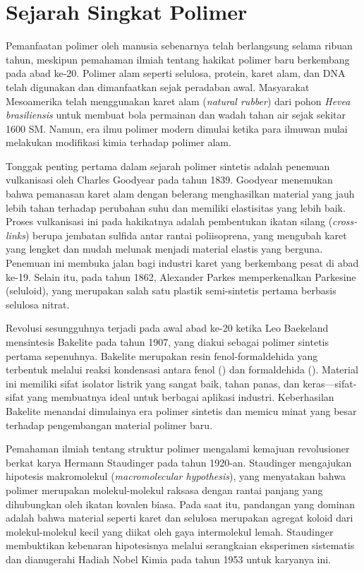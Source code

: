 \documentclass[12pt,a4paper,openany]{book}
\begin{document}
\section{Sejarah Singkat Polimer}

Pemanfaatan polimer oleh manusia sebenarnya telah berlangsung selama ribuan tahun, meskipun pemahaman ilmiah tentang hakikat polimer baru berkembang pada abad ke-20. Polimer alam seperti selulosa, protein, karet alam, dan DNA telah digunakan dan dimanfaatkan sejak peradaban awal. Masyarakat Mesoamerika telah menggunakan karet alam (\textit{natural rubber}) dari pohon \textit{Hevea brasiliensis} untuk membuat bola permainan dan wadah tahan air sejak sekitar 1600 SM. Namun, era ilmu polimer modern dimulai ketika para ilmuwan mulai melakukan modifikasi kimia terhadap polimer alam.

Tonggak penting pertama dalam sejarah polimer sintetis adalah penemuan vulkanisasi oleh Charles Goodyear pada tahun 1839. Goodyear menemukan bahwa pemanasan karet alam dengan belerang menghasilkan material yang jauh lebih tahan terhadap perubahan suhu dan memiliki elastisitas yang lebih baik. Proses vulkanisasi ini pada hakikatnya adalah pembentukan ikatan silang (\textit{cross-links}) berupa jembatan sulfida  antar rantai poliisoprena, yang mengubah karet yang lengket dan mudah melunak menjadi material elastis yang berguna. Penemuan ini membuka jalan bagi industri karet yang berkembang pesat di abad ke-19. Selain itu, pada tahun 1862, Alexander Parkes memperkenalkan Parkesine (seluloid), yang merupakan salah satu plastik semi-sintetis pertama berbasis selulosa nitrat.

Revolusi sesungguhnya terjadi pada awal abad ke-20 ketika Leo Baekeland mensintesis Bakelite pada tahun 1907, yang diakui sebagai polimer sintetis pertama sepenuhnya. Bakelite merupakan resin fenol-formaldehida yang terbentuk melalui reaksi kondensasi antara fenol () dan formaldehida (). Material ini memiliki sifat isolator listrik yang sangat baik, tahan panas, dan keras---sifat-sifat yang membuatnya ideal untuk berbagai aplikasi industri. Keberhasilan Bakelite menandai dimulainya era polimer sintetis dan memicu minat yang besar terhadap pengembangan material polimer baru.

Pemahaman ilmiah tentang struktur polimer mengalami kemajuan revolusioner berkat karya Hermann Staudinger pada tahun 1920-an. Staudinger mengajukan hipotesis makromolekul (\textit{macromolecular hypothesis}), yang menyatakan bahwa polimer merupakan molekul-molekul raksasa dengan rantai panjang yang dihubungkan oleh ikatan kovalen biasa. Pada saat itu, pandangan yang dominan adalah bahwa material seperti karet dan selulosa merupakan agregat koloid dari molekul-molekul kecil yang diikat oleh gaya intermolekul lemah. Staudinger membuktikan kebenaran hipotesisnya melalui serangkaian eksperimen sistematis dan dianugerahi Hadiah Nobel Kimia pada tahun 1953 untuk karyanya ini.
\end{document}
